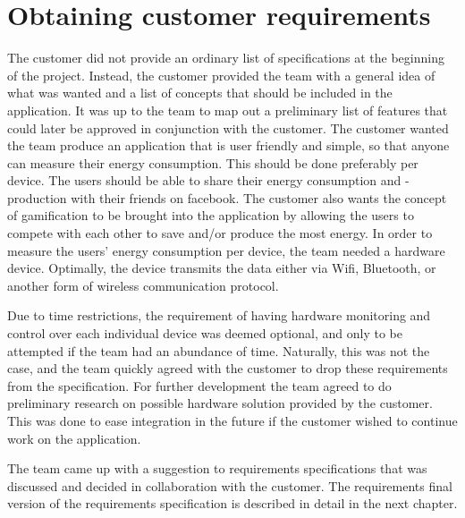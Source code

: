 \section{Obtaining customer requirements}
\label{sec:obtainingreq}

The customer did not provide an ordinary list of specifications at the beginning of the project. Instead, the customer provided the team with a general idea of what was wanted and a list of concepts that should be included in the application. It was up to the team to map out a preliminary list of features that could later be approved in conjunction with the customer. The customer wanted the team produce an application that is user friendly and simple, 
so that anyone can measure their energy consumption. This should be done preferably per device. The users should be able to share their energy consumption and -production with their friends on \gls{facebook}. 
The customer also wants the concept of \gls{gamification} to be brought into the application by allowing the users to compete with each other to save and/or produce the most energy. 
In order to measure the users' energy consumption per device, the team needed a hardware device. Optimally, the device transmits the data either via Wifi, Bluetooth, or another form of wireless communication protocol.

Due to time restrictions, the requirement of having hardware monitoring and control over each individual device was deemed optional, and only to be attempted if the team had an abundance of time. Naturally, this was not the case, and the team quickly agreed with the customer to drop these requirements from the specification. For further development the team agreed to do preliminary research on possible hardware solution provided by the customer. This was done to ease integration in the future if the customer wished to continue work on the application.

The team came up with a suggestion to requirements specifications that was discussed and decided in collaboration with the customer. The requirements final version of the requirements specification is described in detail in the next chapter.